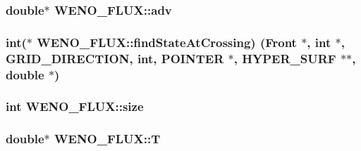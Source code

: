 \subsubsection[{\texorpdfstring{adv}{adv}}]{\setlength{\rightskip}{0pt plus 5cm}double$\ast$ W\+E\+N\+O\+\_\+\+F\+L\+U\+X\+::adv}\hypertarget{class_w_e_n_o___f_l_u_x_af7482c91f03b85fbcb7ca1d0afe314ad}{}\label{class_w_e_n_o___f_l_u_x_af7482c91f03b85fbcb7ca1d0afe314ad}
\subsubsection[{\texorpdfstring{find\+State\+At\+Crossing}{findStateAtCrossing}}]{\setlength{\rightskip}{0pt plus 5cm}int($\ast$ W\+E\+N\+O\+\_\+\+F\+L\+U\+X\+::find\+State\+At\+Crossing) ({\bf Front} $\ast$, int $\ast$, {\bf G\+R\+I\+D\+\_\+\+D\+I\+R\+E\+C\+T\+I\+ON}, int, {\bf P\+O\+I\+N\+T\+ER} $\ast$, {\bf H\+Y\+P\+E\+R\+\_\+\+S\+U\+RF} $\ast$$\ast$, double $\ast$)}\hypertarget{class_w_e_n_o___f_l_u_x_aa3fb08c26937c6bfbcbe44a36d9c6cc2}{}\label{class_w_e_n_o___f_l_u_x_aa3fb08c26937c6bfbcbe44a36d9c6cc2}
\subsubsection[{\texorpdfstring{size}{size}}]{\setlength{\rightskip}{0pt plus 5cm}int W\+E\+N\+O\+\_\+\+F\+L\+U\+X\+::size}\hypertarget{class_w_e_n_o___f_l_u_x_a3f14a450e285ec0f4863aaabbbdb42a9}{}\label{class_w_e_n_o___f_l_u_x_a3f14a450e285ec0f4863aaabbbdb42a9}
\subsubsection[{\texorpdfstring{T}{T}}]{\setlength{\rightskip}{0pt plus 5cm}double$\ast$ W\+E\+N\+O\+\_\+\+F\+L\+U\+X\+::T}\hypertarget{class_w_e_n_o___f_l_u_x_a56349578a681042c1dd6cdaadc94ae91}{}\label{class_w_e_n_o___f_l_u_x_a56349578a681042c1dd6cdaadc94ae91}
